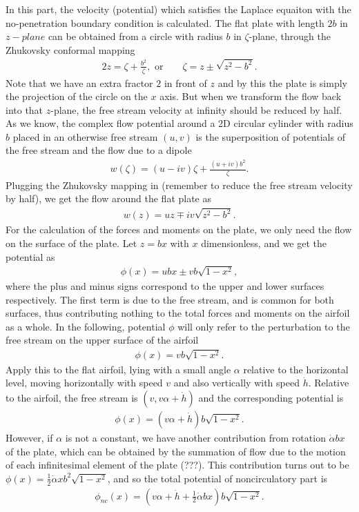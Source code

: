 In this part, the velocity (potential) which satisfies the Laplace equaiton with the no-penetration boundary condition is calculated.
The flat plate with length $2b$ in $z-plane$ can be obtained from a circle with radius $b$ in $\zeta$-plane, through the Zhukovsky conformal mapping
\begin{align}
2z = \zeta + \frac{b^2}{\zeta},    \text{   or~~~~~~}   \zeta =z \pm \sqrt{z^2-b^2}.
\end{align}
Note that we have an extra fractor $2$ in front of $z$ and by this the plate is simply the projection of the circle on the  $x$ axis.
But when we transform the flow back into that $z$-plane, the free stream velocity at infinity should be reduced by half.
As we know, the complex flow potential around a 2D circular cylinder with radius $b$ placed in an otherwise free stream $(u,v)$ is the superposition of potentials of the free stream and the flow due to a dipole 
\begin{align}
w(\zeta) = (u-iv)\zeta+\frac{(u+iv)b^2}{\zeta}.
\end{align} 
Plugging the Zhukovsky mapping in (remember to reduce the free stream velocity by half), we get the flow around the flat plate as
\begin{align}
w(z) = uz \mp iv\sqrt{z^2-b^2}.
\end{align} 
For the calculation of the forces and moments on the plate, we only need the flow on the surface of the plate.
Let $z = bx$ with $x$ dimensionless, and we get the potential as
\begin{align}
\phi(x) = ubx \pm vb\sqrt{1-x^2},
\end{align} 
where the plus and minus signs correspond to the upper and lower surfaces respectively. 
The first term is due to the free stream, and is common for both surfaces, thus contributing nothing to the total forces and moments on the airfoil as a whole.
In the following, potential $\phi$ will only refer to the perturbation to the free stream on the upper surface of the airfoil
\begin{align}
\phi(x) = vb\sqrt{1-x^2}.
\end{align} 
Apply this to the flat airfoil, lying with a small angle $\alpha$ relative to the horizontal level, moving horizontally with speed $v$ and also vertically with speed $\dot{h}$. Relative to the airfoil, the free stream is $(v,v\alpha+\dot{h})$ and the corresponding potential is
\begin{align}
\phi(x) = (v\alpha + \dot{h})b\sqrt{1-x^2}.
\end{align} 
However, if $\alpha$ is not a constant, we have another contribution from rotation $\dot{\alpha}bx$ of the plate, which can be obtained by the summation of flow due to the motion of each infinitesimal element of the plate (???).
This contribution turns out to be $\phi(x) = \frac{1}{2}\dot{\alpha}xb^2\sqrt{1-x^2}$, and so the total potential of noncirculatory part is
\begin{align}
\phi_{nc}(x) = (v\alpha + \dot{h} + \frac{1}{2}\dot{\alpha}bx) b\sqrt{1-x^2}.
\end{align} 

